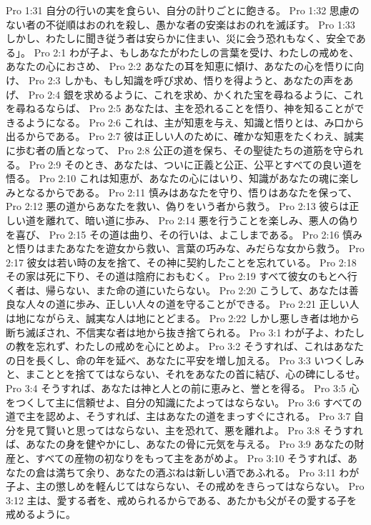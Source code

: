 Pro 1:31  自分の行いの実を食らい、自分の計りごとに飽きる。
Pro 1:32  思慮のない者の不従順はおのれを殺し、愚かな者の安楽はおのれを滅ぼす。
Pro 1:33  しかし、わたしに聞き従う者は安らかに住まい、災に会う恐れもなく、安全である」。
Pro 2:1  わが子よ、もしあなたがわたしの言葉を受け、わたしの戒めを、あなたの心におさめ、
Pro 2:2  あなたの耳を知恵に傾け、あなたの心を悟りに向け、
Pro 2:3  しかも、もし知識を呼び求め、悟りを得ようと、あなたの声をあげ、
Pro 2:4  銀を求めるように、これを求め、かくれた宝を尋ねるように、これを尋ねるならば、
Pro 2:5  あなたは、主を恐れることを悟り、神を知ることができるようになる。
Pro 2:6  これは、主が知恵を与え、知識と悟りとは、み口から出るからである。
Pro 2:7  彼は正しい人のために、確かな知恵をたくわえ、誠実に歩む者の盾となって、
Pro 2:8  公正の道を保ち、その聖徒たちの道筋を守られる。
Pro 2:9  そのとき、あなたは、ついに正義と公正、公平とすべての良い道を悟る。
Pro 2:10  これは知恵が、あなたの心にはいり、知識があなたの魂に楽しみとなるからである。
Pro 2:11  慎みはあなたを守り、悟りはあなたを保って、
Pro 2:12  悪の道からあなたを救い、偽りをいう者から救う。
Pro 2:13  彼らは正しい道を離れて、暗い道に歩み、
Pro 2:14  悪を行うことを楽しみ、悪人の偽りを喜び、
Pro 2:15  その道は曲り、その行いは、よこしまである。
Pro 2:16  慎みと悟りはまたあなたを遊女から救い、言葉の巧みな、みだらな女から救う。
Pro 2:17  彼女は若い時の友を捨て、その神に契約したことを忘れている。
Pro 2:18  その家は死に下り、その道は陰府におもむく。
Pro 2:19  すべて彼女のもとへ行く者は、帰らない、また命の道にいたらない。
Pro 2:20  こうして、あなたは善良な人々の道に歩み、正しい人々の道を守ることができる。
Pro 2:21  正しい人は地にながらえ、誠実な人は地にとどまる。
Pro 2:22  しかし悪しき者は地から断ち滅ぼされ、不信実な者は地から抜き捨てられる。
Pro 3:1  わが子よ、わたしの教を忘れず、わたしの戒めを心にとめよ。
Pro 3:2  そうすれば、これはあなたの日を長くし、命の年を延べ、あなたに平安を増し加える。
Pro 3:3  いつくしみと、まこととを捨ててはならない、それをあなたの首に結び、心の碑にしるせ。
Pro 3:4  そうすれば、あなたは神と人との前に恵みと、誉とを得る。
Pro 3:5  心をつくして主に信頼せよ、自分の知識にたよってはならない。
Pro 3:6  すべての道で主を認めよ、そうすれば、主はあなたの道をまっすぐにされる。
Pro 3:7  自分を見て賢いと思ってはならない、主を恐れて、悪を離れよ。
Pro 3:8  そうすれば、あなたの身を健やかにし、あなたの骨に元気を与える。
Pro 3:9  あなたの財産と、すべての産物の初なりをもって主をあがめよ。
Pro 3:10  そうすれば、あなたの倉は満ちて余り、あなたの酒ぶねは新しい酒であふれる。
Pro 3:11  わが子よ、主の懲しめを軽んじてはならない、その戒めをきらってはならない。
Pro 3:12  主は、愛する者を、戒められるからである、あたかも父がその愛する子を戒めるように。
